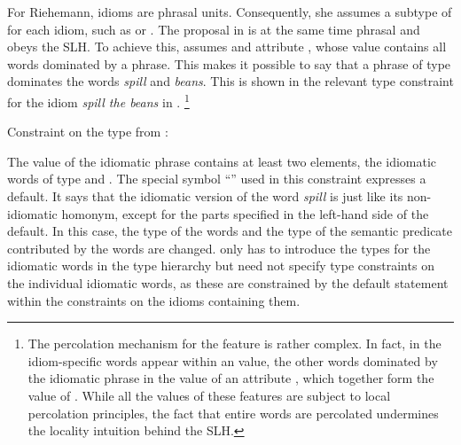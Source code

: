 \documentclass[output=paper]{langsci/langscibook}
\begin{document}
For Riehemann, idioms are phrasal units. 
Consequently, she assumes a subtype of  for each idiom, such as  or .
The proposal in \cite{Riehemann2001a} is at the same time phrasal and obeys the SLH. To achieve this, \cite{Riehemann2001a} assumes and attribute , whose value contains all words dominated by a phrase. This makes it possible to say that a phrase of type  dominates the words \emph{spill} and \emph{beans}. This is shown in the relevant type constraint for the idiom \emph{spill the beans} in .%
\footnote{The percolation mechanism for the feature  is rather complex. In fact, in \cite[Section 5.2.1]{Riehemann2001a} the idiom-specific words appear within an  value, the other words dominated by the idiomatic phrase in the value of an attribute , which together form the value of . While all the values of these features are subject to local percolation principles, the fact that entire words are percolated undermines the locality intuition behind the SLH.}


\vbox{
\ea Constraint on the type  from \citet[185]{Riehemann2001a}:\label{sr-spillbeans}\\
\z 
}

The  value of the idiomatic phrase contains at least two elements, the idiomatic words of type  and . 
The special symbol ``\srdefault'' used in this constraint expresses a default. It says that the idiomatic version of the word \emph{spill} is just like its non-idiomatic homonym, except for the parts specified in the left-hand side of the default. 
In this case, the type of the words and the type of the semantic predicate contributed by the words are changed. 
\cite{Riehemann2001a} only has to introduce the types for the idiomatic words in the type hierarchy but need not specify type constraints on the individual idiomatic words, as these are constrained by the default statement within the constraints on the idioms containing them.
\end{document}

